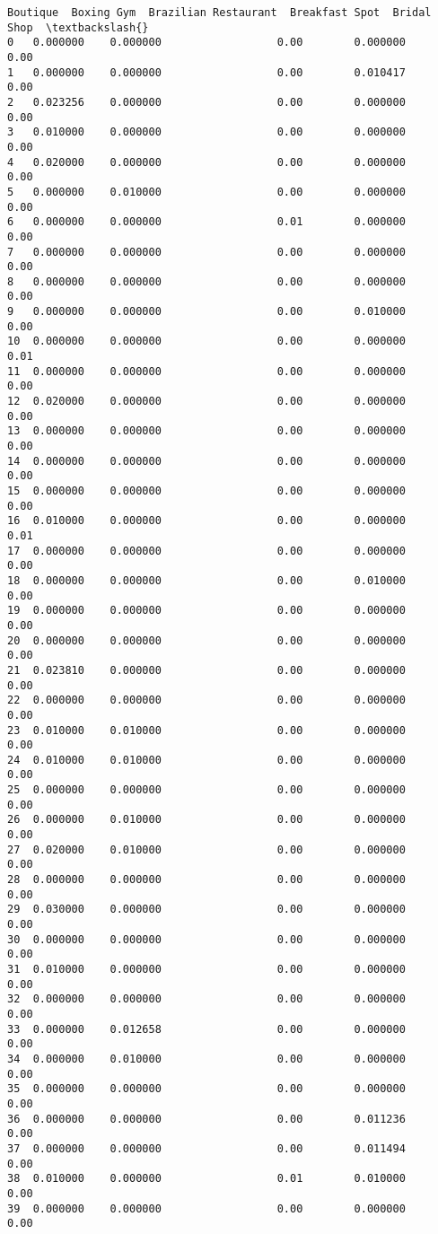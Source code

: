 \documentclass[11pt]{article}
\begin{document}
\begin{tcolorbox}[breakable, size=fbox, boxrule=.5pt, pad at break*=1mm, opacityfill=0]
\begin{Verbatim}[commandchars=\\\{\}]
    Boutique  Boxing Gym  Brazilian Restaurant  Breakfast Spot  Bridal Shop  \textbackslash{}
0   0.000000    0.000000                  0.00        0.000000         0.00
1   0.000000    0.000000                  0.00        0.010417         0.00
2   0.023256    0.000000                  0.00        0.000000         0.00
3   0.010000    0.000000                  0.00        0.000000         0.00
4   0.020000    0.000000                  0.00        0.000000         0.00
5   0.000000    0.010000                  0.00        0.000000         0.00
6   0.000000    0.000000                  0.01        0.000000         0.00
7   0.000000    0.000000                  0.00        0.000000         0.00
8   0.000000    0.000000                  0.00        0.000000         0.00
9   0.000000    0.000000                  0.00        0.010000         0.00
10  0.000000    0.000000                  0.00        0.000000         0.01
11  0.000000    0.000000                  0.00        0.000000         0.00
12  0.020000    0.000000                  0.00        0.000000         0.00
13  0.000000    0.000000                  0.00        0.000000         0.00
14  0.000000    0.000000                  0.00        0.000000         0.00
15  0.000000    0.000000                  0.00        0.000000         0.00
16  0.010000    0.000000                  0.00        0.000000         0.01
17  0.000000    0.000000                  0.00        0.000000         0.00
18  0.000000    0.000000                  0.00        0.010000         0.00
19  0.000000    0.000000                  0.00        0.000000         0.00
20  0.000000    0.000000                  0.00        0.000000         0.00
21  0.023810    0.000000                  0.00        0.000000         0.00
22  0.000000    0.000000                  0.00        0.000000         0.00
23  0.010000    0.010000                  0.00        0.000000         0.00
24  0.010000    0.010000                  0.00        0.000000         0.00
25  0.000000    0.000000                  0.00        0.000000         0.00
26  0.000000    0.010000                  0.00        0.000000         0.00
27  0.020000    0.010000                  0.00        0.000000         0.00
28  0.000000    0.000000                  0.00        0.000000         0.00
29  0.030000    0.000000                  0.00        0.000000         0.00
30  0.000000    0.000000                  0.00        0.000000         0.00
31  0.010000    0.000000                  0.00        0.000000         0.00
32  0.000000    0.000000                  0.00        0.000000         0.00
33  0.000000    0.012658                  0.00        0.000000         0.00
34  0.000000    0.010000                  0.00        0.000000         0.00
35  0.000000    0.000000                  0.00        0.000000         0.00
36  0.000000    0.000000                  0.00        0.011236         0.00
37  0.000000    0.000000                  0.00        0.011494         0.00
38  0.010000    0.000000                  0.01        0.010000         0.00
39  0.000000    0.000000                  0.00        0.000000         0.00


\end{Verbatim}
\end{tcolorbox}
\end{document}
